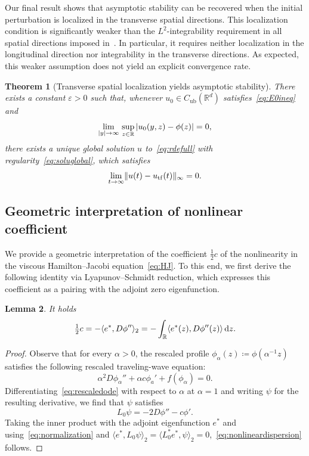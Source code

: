 \documentclass[12pt,oneside,a4paper,reqno]{amsart}
\numberwithin{equation}{section}
\newtheorem{theorem}{Theorem}[section]
\newtheorem{lemma}[theorem]{Lemma}
\theoremstyle{definition}
\theoremstyle{remark}
\newcommand{\bbR}{{\mathbb R}}
\newcommand{\rd}{{\,\rm{d}}}
\newcommand{\eps}{\varepsilon}
\newcommand{\Cub}{{C_{\mathrm{ub}}}}
\DeclarePairedDelimiter{\abs}{\lvert}{\rvert}
\DeclarePairedDelimiter{\norm}{\lVert}{\rVert}
\begin{document}
Our final result shows that asymptotic stability can be recovered when the initial perturbation is localized in the transverse spatial directions. This localization condition is significantly weaker than the $L^2$-integrability requirement in all spatial directions imposed in~\cite{kapitula_multidimensional_1997}. In particular, it requires neither localization in the longitudinal direction nor integrability in the transverse directions. As expected, this weaker assumption does not yield an explicit convergence rate.
\begin{theorem}[Transverse spatial localization yields asymptotic stability]
    \label{thm:decay}
    There exists a constant $\eps > 0$ such that, whenever $u_0 \in \Cub(\bbR^d)$ satisfies~\eqref{eq:E0ineq} and
	\begin{equation*}
		\lim_{\abs{y} \to \infty} \, \sup_{z \in \bbR} \, \abs{u_0(y,z) - \phi(z)} = 0,
	\end{equation*}
    there exists a unique global solution $u$ to~\eqref{eq:rdefull} with regularity~\eqref{eq:soluglobal}, which  satisfies
    \begin{equation*}
        \lim_{t \to \infty}\norm{u(t) - u_{\mathrm{tf}}(t)}_{\infty} = 0.
    \end{equation*}
\end{theorem}

\subsection{Geometric interpretation of nonlinear coefficient}
\label{subsec:coeff}
We provide a geometric interpretation of the coefficient $\frac12 c$ of the nonlinearity in the viscous Hamilton--Jacobi equation~\eqref{eq:HJ}. To this end, we first derive the following identity via Lyapunov--Schmidt reduction, which expresses this coefficient as a pairing with the adjoint zero eigenfunction.
\begin{lemma} \label{lem:ndispersion}
It holds
\begin{align}
    \label{eq:nonlineardispersion}
     \tfrac{1}{2}c = -\langle e^*,D\phi''\rangle_2 = -\int_{\bbR} \langle e^*(z),D\phi''(z)\rangle \rd z.
\end{align}
\end{lemma}
\begin{proof}
Observe that for every $\alpha > 0$, the rescaled profile $\phi_{\alpha}(z) \coloneq \phi(\alpha^{-1}z)$ satisfies the following rescaled traveling-wave equation:
\begin{equation}
    \label{eq:rescaledode}
	\alpha^2 D \phi_{\alpha}'' + {\alpha}c \phi_a' + f(\phi_{\alpha}) = 0.
\end{equation}
Differentiating~\eqref{eq:rescaledode} with respect to $\alpha$ at $\alpha = 1$ and writing $\psi$ for the resulting derivative, we find that $\psi$ satisfies
\begin{equation*}
	L_0\psi = -2 D \phi'' - c \phi'.
\end{equation*}
Taking the inner product with the adjoint eigenfunction $e^*$ and using~\eqref{eq:normalization} and $\langle e^*,L_0 \psi\rangle_2 = \langle L_0^* e^*,\psi\rangle_2 = 0$,~\eqref{eq:nonlineardispersion} follows.
\end{proof}
\end{document}
